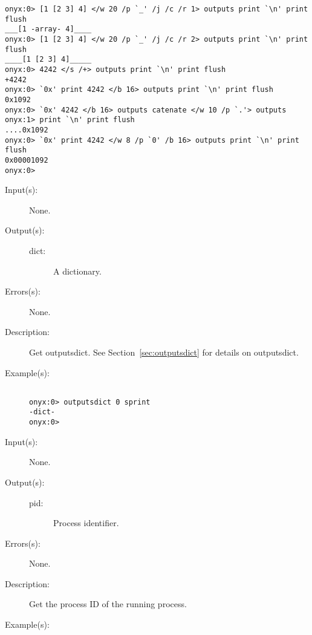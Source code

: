 \begin{description}
\begin{description}
\begin{verbatim}
onyx:0> [1 [2 3] 4] </w 20 /p `_' /j /c /r 1> outputs print `\n' print flush
___[1 -array- 4]____
onyx:0> [1 [2 3] 4] </w 20 /p `_' /j /c /r 2> outputs print `\n' print flush
____[1 [2 3] 4]_____
onyx:0> 4242 </s /+> outputs print `\n' print flush
+4242
onyx:0> `0x' print 4242 </b 16> outputs print `\n' print flush
0x1092
onyx:0> `0x' 4242 </b 16> outputs catenate </w 10 /p `.'> outputs 
onyx:1> print `\n' print flush
....0x1092
onyx:0> `0x' print 4242 </w 8 /p `0' /b 16> outputs print `\n' print flush
0x00001092
onyx:0>
		\end{verbatim}
	\end{description}
\label{systemdict:outputsdict}
\item[{\onyxop{--}{outputsdict}{dict}}: ]
	\begin{description}\item[]
	\item[Input(s): ] None.
	\item[Output(s): ]
		\begin{description}\item[]
		\item[dict: ]
			A dictionary.
		\end{description}
	\item[Errors(s): ] None.
	\item[Description: ]
		Get outputsdict.  See Section~\ref{sec:outputsdict} for details
		on outputsdict.
	\item[Example(s): ]\begin{verbatim}

onyx:0> outputsdict 0 sprint
-dict-
onyx:0>
		\end{verbatim}
	\end{description}
\label{systemdict:pid}
\item[{\onyxop{--}{pid}{pid}}: ]
	\begin{description}\item[]
	\item[Input(s): ] None.
	\item[Output(s): ]
		\begin{description}\item[]
		\item[pid: ]
			Process identifier.
		\end{description}
	\item[Errors(s): ] None.
	\item[Description: ]
		Get the process ID of the running process.
	\item[Example(s): ]\begin{verbatim}


\end{verbatim}
\end{description}
\end{description}
